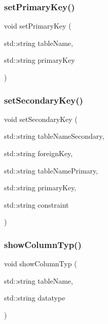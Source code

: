 \mbox{\label{sqllib_8hpp_aac2797835afcf68b73ba522e7bb91f5f}} 
\subsubsection{set\+Primary\+Key()}
{\footnotesize\ttfamily void set\+Primary\+Key (\begin{DoxyParamCaption}\item[{std\+::string}]{table\+Name,  }\item[{std\+::string}]{primary\+Key }\end{DoxyParamCaption})}

\mbox{\label{sqllib_8hpp_a4aca01f302c4488d661196653d8f6c28}} 
\subsubsection{set\+Secondary\+Key()}
{\footnotesize\ttfamily void set\+Secondary\+Key (\begin{DoxyParamCaption}\item[{std\+::string}]{table\+Name\+Secondary,  }\item[{std\+::string}]{foreign\+Key,  }\item[{std\+::string}]{table\+Name\+Primary,  }\item[{std\+::string}]{primary\+Key,  }\item[{std\+::string}]{constraint }\end{DoxyParamCaption})}

\mbox{\label{sqllib_8hpp_addc31570307c41c7327c3da4886ae7bf}} 
\subsubsection{show\+Column\+Typ()}
{\footnotesize\ttfamily void show\+Column\+Typ (\begin{DoxyParamCaption}\item[{std\+::string}]{table\+Name,  }\item[{std\+::string}]{datatype }\end{DoxyParamCaption})}

\mbox{\label{sqllib_8hpp_a812cc82c697df37c6a8a482f85972b4b}} 
